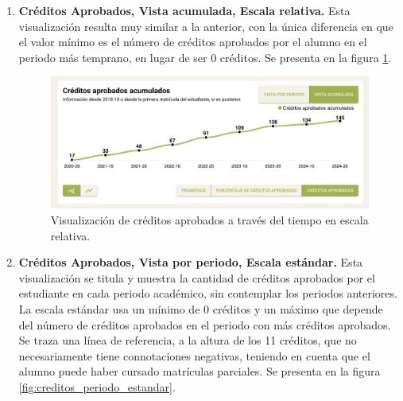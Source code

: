 \begin{enumerate}
	\item \textbf{Créditos Aprobados, Vista acumulada, Escala relativa.} Esta visualización resulta muy similar a la anterior, con la única diferencia en que el valor mínimo es el número de créditos aprobados por el alumno en el periodo más temprano, en lugar de ser 0 créditos. Se presenta en la figura \ref{fig:creditos_relativo}.

	      \begin{figure}[H]
		      \noindent
		      \hspace{\leftmargin}
		      \begin{minipage}{\dimexpr\linewidth-\leftmargin\relax}
			      \includegraphics[width=\linewidth]{assets/nes/creditos_relativo.png}
			      \caption{Visualización de créditos aprobados a través del tiempo en escala relativa.}
			      \label{fig:creditos_relativo}
		      \end{minipage}
	      \end{figure}

	\item \textbf{Créditos Aprobados, Vista por periodo, Escala estándar.} Esta visualización se titula  y muestra la cantidad de créditos aprobados por el estudiante en cada periodo académico, sin contemplar los periodos anteriores. La escala estándar usa un mínimo de 0 créditos y un máximo que depende del número de créditos aprobados en el periodo con más créditos aprobados. Se traza una línea de referencia, a la altura de los 11 créditos, que no necesariamente tiene connotaciones negativas, teniendo en cuenta que el alumno puede haber cursado matrículas parciales. Se presenta en la figura \ref{fig:creditos_periodo_estandar}.


\end{enumerate}
